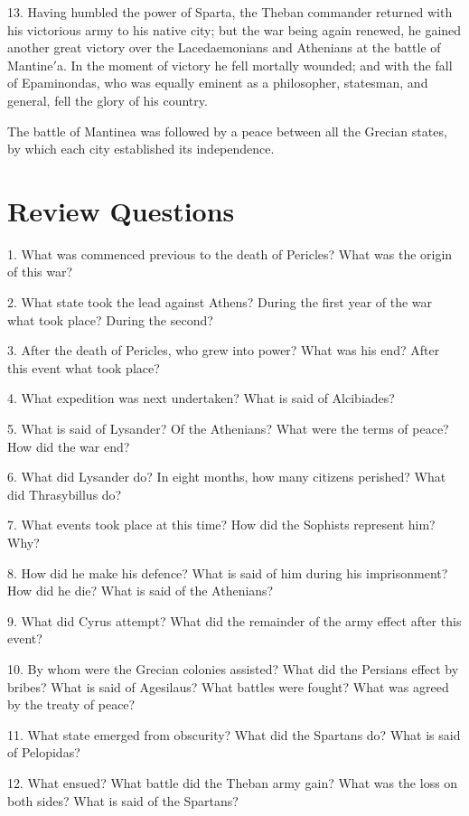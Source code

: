 \documentclass[openany,a4paper]{memoir}
\begin{document}
13. Having humbled the power of Sparta, the Theban 
commander returned with his victorious army to his native 
city; but the war being again renewed, he gained another 
great victory over the Lacedaemonians and Athenians at the 
battle of Mantine$'$a. In the moment of victory he fell mortally wounded; and with the fall of Epaminondas, who was 
equally eminent as a philosopher, statesman, and general, fell 
the glory of his country. 

The battle of Mantinea was followed by a peace between 
all the Grecian states, by which each city established its independence. 

\section{Review Questions}


1. What was commenced previous to the death of 
Pericles? What was the origin of this war? 

2. What state took the lead against Athens? During the first year 
of the war what took place? During the second?

3. After the death 
of Pericles, who grew into power? What was his end? After this 
event what took place?

4. What expedition was next undertaken? 
What is said of Alcibiades?

5. What is said of Lysander? 
Of the Athenians? What were the terms of peace? How did the 
war end?

6. What did Lysander do? In eight months, how many 
citizens perished? What did Thrasybillus do?

7. What events took 
place at this time? How did the Sophists represent him? Why?

8. How did he make his defence? What is said of him during his imprisonment? 
How did he die? What is said of the Athenians?

9. What did Cyrus attempt? What did the remainder of the army effect after this 
event? 

10. By whom were the Grecian colonies assisted? What did 
the Persians effect by bribes? What is said of Agesilaus? What battles 
were fought? What was agreed by the treaty of peace? 

11. What 
state emerged from obscurity? What did the Spartans do? 
What is said of Pelopidas? 

12. What ensued? What battle did the 
Theban army gain? What was the loss on both sides? What is said 
of the Spartans? 
\end{document}
